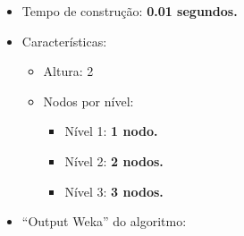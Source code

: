 \documentclass[
    article,            %
    11pt,               %
    oneside,            %
    a4paper,            %
    english,            %
    brazil,             %
    sumario=tradicional,
    ]{abntex2}
\begin{document}
    \begin{itemize}
        \item Tempo de construção: \textbf{0.01 segundos.}
        \item Características:
        \begin{itemize}
            \item Altura: 2
            \item Nodos por nível:
                \begin{itemize}
                    \item Nível 1: \textbf{1 nodo.}
                    \item Nível 2: \textbf{2 nodos.}
                    \item Nível 3: \textbf{3 nodos.}
                \end{itemize}
        \end{itemize}
        \item ``Output Weka'' do algoritmo:
    \end{itemize}   
\end{document}
